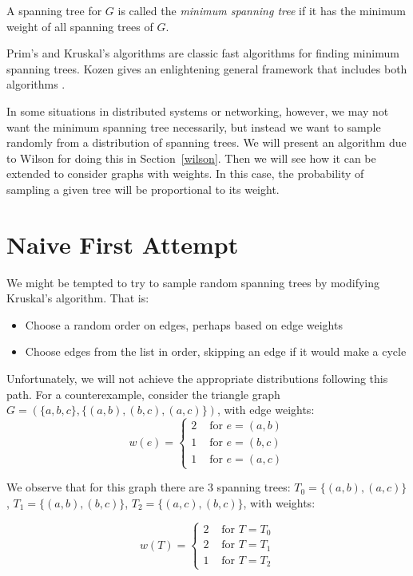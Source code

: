 \documentclass[11pt]{article}
\begin{document}
\begin{defn}
A spanning tree for $G$ is called the \emph{minimum spanning tree} if it has the
minimum weight of all spanning trees of $G$.
\end{defn}

Prim's and Kruskal's algorithms are classic fast algorithms for finding minimum
spanning trees. Kozen gives an enlightening general framework that includes both
algorithms \cite{kozen}.

In some situations in distributed systems or networking, however, we may not
want the minimum spanning tree necessarily, but instead we want to sample
randomly from a distribution of spanning trees. We will present an algorithm due
to Wilson \cite{wilson} for doing this in Section~\ref{wilson}. Then we will see
how it can be extended to consider graphs with weights. In this case, the
probability of sampling a given tree will be proportional to its weight.



\section{Naive First Attempt}\label{naive-attempt}

We might be tempted to try to sample random spanning trees by modifying
Kruskal's algorithm. That is:
\begin{itemize}
\item Choose a random order on edges, perhaps based on edge weights
\item Choose edges from the list in order, skipping an edge if it would make a
cycle
\end{itemize}

Unfortunately, we will not achieve the appropriate distributions following this
path. For a counterexample, consider the triangle graph $G = (\{a,b,c\},
\{(a,b),(b,c),(a,c)\})$, with edge weights:
\[w(e) = \begin{cases}
        2 & \text{ for } e = (a,b)\\
        1 & \text{ for } e = (b,c)\\
        1 & \text{ for } e = (a,c)
        \end{cases}\]

We observe that for this graph there are 3 spanning trees:
$T_0 = \{(a,b), (a,c)\}$,
$T_1 = \{(a,b), (b,c)\}$,
$T_2 = \{(a,c), (b,c)\}$, with weights:

\[w(T) = \begin{cases}
        2 & \text{ for } T = T_0\\
        2 & \text{ for } T = T_1\\
        1 & \text{ for } T = T_2
        \end{cases}\]
\end{document}
